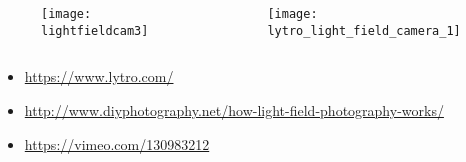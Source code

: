 \begin{frame}
\begin{columns}
\begin{column}{.5\textwidth}
\begin{figure}[!h]
\centering
\texttt{[image: lightfieldcam3]}
\end{figure}
\end{column}
\begin{column}{.5\textwidth}
\begin{figure}[!h]
\centering
\texttt{[image: lytro\_light\_field\_camera\_1]}
\end{figure}
\end{column}
\end{columns}
\begin{itemize}
\item \url{https://www.lytro.com/}
\item \url{http://www.diyphotography.net/how-light-field-photography-works/}
\item \url{https://vimeo.com/130983212}
\end{itemize}
\end{frame}

%



